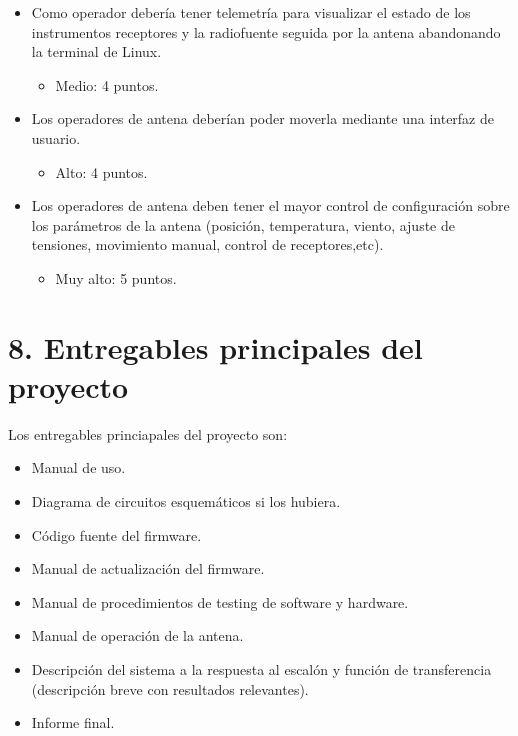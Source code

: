 \documentclass[11pt, %
codirector, %
]{charter}
\begin{document}
\begin{itemize}
	\item Como operador debería tener telemetría para visualizar el estado de los instrumentos receptores y la radiofuente seguida por la antena abandonando la terminal de Linux. 
		\begin{itemize}
			\item Medio: 4 puntos.
		\end{itemize}

	\item Los operadores de antena deberían poder moverla mediante una interfaz de usuario. 
		\begin{itemize}
			\item Alto: 4 puntos.
		\end{itemize}
	
	\item Los operadores de antena deben tener el mayor control de configuración sobre los parámetros de la antena (posición, temperatura, viento, ajuste de tensiones, movimiento manual, control de receptores,etc). 
		\begin{itemize}
			\item Muy alto: 5 puntos.
		\end{itemize}
		

\end{itemize}

% 



\section{8. Entregables principales del proyecto}
\label{sec:entregables}



Los entregables princiapales del proyecto son:

\begin{itemize}
	\item Manual de uso. 
	\item Diagrama de circuitos esquemáticos si los hubiera. 
	\item Código fuente del firmware. 
	\item Manual de actualización del firmware.  
	\item Manual de procedimientos de testing de software y hardware.
	\item Manual de operación de la antena. 
	\item Descripción del sistema a la respuesta al escalón y función de transferencia (descripción breve con resultados relevantes).
	\item Informe final.
\end{itemize}
\end{document}
